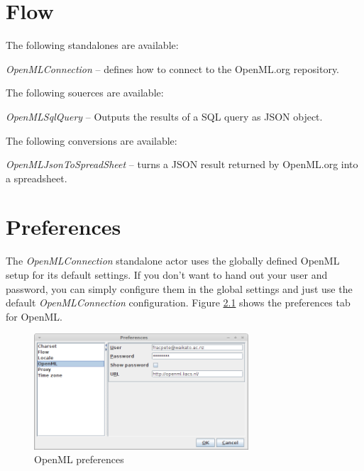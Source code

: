 \documentclass[a4paper]{book}
\begin{document}
\chapter{Flow}
The following standalones are available:
\begin{tight_itemize}
	\item \textit{OpenMLConnection} -- defines how to connect to the OpenML.org repository.
\end{tight_itemize}
The following souerces are available:
\begin{tight_itemize}
	\item \textit{OpenMLSqlQuery} -- Outputs the results of a SQL query as JSON object.
\end{tight_itemize}
The following conversions are available:
\begin{tight_itemize}
	\item \textit{OpenMLJsonToSpreadSheet} -- turns a JSON result returned by OpenML.org 
	into a spreadsheet.
\end{tight_itemize}

\chapter{Preferences}
\label{preferences}
The \textit{OpenMLConnection} standalone actor uses the globally defined
OpenML setup for its default settings. If you don't want to hand out your
user and password, you can simply configure them in the global
settings and just use the default \textit{OpenMLConnection} configuration.
Figure \ref{openml_preferences} shows the preferences tab for OpenML.
\begin{figure}[htb]
  \centering
  \includegraphics[width=8.0cm]{images/openml_preferences.png}
  \caption{OpenML preferences}
  \label{openml_preferences}
\end{figure}


\end{document}

